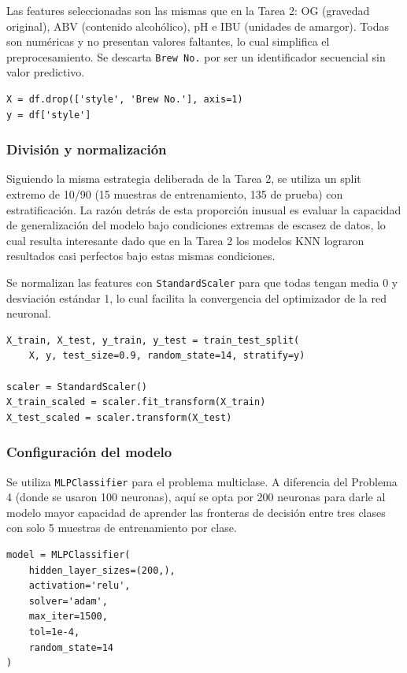 \documentclass{article}
\begin{document}
Las features seleccionadas son las mismas que en la Tarea 2: OG (gravedad original), ABV (contenido alcohólico), pH e IBU (unidades de amargor). Todas son numéricas y no presentan valores faltantes, lo cual simplifica el preprocesamiento. Se descarta \texttt{Brew No.} por ser un identificador secuencial sin valor predictivo.

\begin{lstlisting}
X = df.drop(['style', 'Brew No.'], axis=1)
y = df['style']
\end{lstlisting}

\subsubsection{División y normalización}

Siguiendo la misma estrategia deliberada de la Tarea 2, se utiliza un split extremo de 10/90 (15 muestras de entrenamiento, 135 de prueba) con estratificación. La razón detrás de esta proporción inusual es evaluar la capacidad de generalización del modelo bajo condiciones extremas de escasez de datos, lo cual resulta interesante dado que en la Tarea 2 los modelos KNN lograron resultados casi perfectos bajo estas mismas condiciones.

Se normalizan las features con \texttt{StandardScaler} para que todas tengan media 0 y desviación estándar 1, lo cual facilita la convergencia del optimizador de la red neuronal.

\begin{lstlisting}
X_train, X_test, y_train, y_test = train_test_split(
    X, y, test_size=0.9, random_state=14, stratify=y)

scaler = StandardScaler()
X_train_scaled = scaler.fit_transform(X_train)
X_test_scaled = scaler.transform(X_test)
\end{lstlisting}

\subsubsection{Configuración del modelo}

Se utiliza \texttt{MLPClassifier} para el problema multiclase. A diferencia del Problema 4 (donde se usaron 100 neuronas), aquí se opta por 200 neuronas para darle al modelo mayor capacidad de aprender las fronteras de decisión entre tres clases con solo 5 muestras de entrenamiento por clase.

\begin{lstlisting}
model = MLPClassifier(
    hidden_layer_sizes=(200,),
    activation='relu',
    solver='adam',
    max_iter=1500,
    tol=1e-4,
    random_state=14
)
\end{lstlisting}
\end{document}
